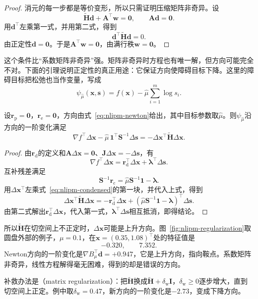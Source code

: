\begin{proof}
消元的每一步都是等价变形，所以只需证明压缩矩阵非奇异。设
\[
 \tilde{\bm{H}}\bm{d}+\bm{A}^\top\bm{w}=\bm{0},\qquad\bm{A}\bm{d}=\bm{0}.
\]
用$\bm{d}^\top$左乘第一式，并用第二式，得到
\[
 \bm{d}^\top\tilde{\bm{H}}\bm{d}=0.
\]
由正定性$\bm{d}=\bm{0}$。于是$\bm{A}^\top\bm{w}=\bm{0}$，由满行秩$\bm{w}=\bm{0}$。
\end{proof}

这个条件比“系数矩阵非奇异”强。矩阵非奇异时方程也有唯一解，但方向可能完全不对。下面的引理说明正定性的真正用途：它保证方向使障碍目标下降。这里的障碍目标把松弛也当作变量，写成
\[
 \psi_{\hat{\mu}}(\bm{x},\bm{s})=f(\bm{x})-\hat{\mu}\sum_{i=1}^m\log s_i.
\]

\begin{lemma}[方向与障碍目标]
\label{lem:nlipm-descent}
设$\bm{r}_{\mathrm{p}}=\bm{0}$，$\bm{r}_{\mathrm{e}}=\bm{0}$，方向由式~\eqref{eq:nlipm-newton}给出，其中目标参数取$\hat{\mu}$。则$\psi_{\hat{\mu}}$沿方向的一阶变化满足
\begin{equation}
 \nabla f^\top\Delta\bm{x}-\hat{\mu}\,\bm{1}^\top\bm{S}^{-1}\Delta\bm{s}=-\Delta\bm{x}^\top\tilde{\bm{H}}\Delta\bm{x}.
 \label{eq:nlipm-descent}
\end{equation}
\end{lemma}

\begin{proof}
由$\bm{r}_{\mathrm{d}}$的定义和$\bm{A}\Delta\bm{x}=\bm{0}$、$\bm{J}\Delta\bm{x}=-\Delta\bm{s}$，有
\[
 \nabla f^\top\Delta\bm{x}=\bm{r}_{\mathrm{d}}^\top\Delta\bm{x}+\bm{\lambda}^\top\Delta\bm{s}.
\]
互补残差满足
\[
 \bm{S}^{-1}\bm{r}_{\mathrm{c}}=\hat{\mu}\bm{S}^{-1}\bm{1}-\bm{\lambda}.
\]
用$\Delta\bm{x}^\top$左乘式~\eqref{eq:nlipm-condensed}的第一块，并代入上式，得到
\[
 \Delta\bm{x}^\top\tilde{\bm{H}}\Delta\bm{x}=-\bm{r}_{\mathrm{d}}^\top\Delta\bm{x}+(\hat{\mu}\bm{S}^{-1}\bm{1}-\bm{\lambda})^\top\Delta\bm{s}.
\]
由第二式解出$\bm{r}_{\mathrm{d}}^\top\Delta\bm{x}$，代入第一式，$\bm{\lambda}^\top\Delta\bm{s}$相互抵消，即得结论。
\end{proof}

所以$\tilde{\bm{H}}$在切空间上不正定时，$\Delta\bm{x}$可能是上升方向。图~\ref{fig:nlipm-regularization}取圆盘外部的例子，$\mu=0.1$，在$\bm{x}=(0.35,1.08)^\top$处的特征值是
\[
 -0.320,\qquad 7.352.
\]
Newton方向的一阶变化是$\nabla B_\mu^\top\bm{d}=+0.947$，它是上升方向，指向鞍点。系数矩阵非奇异，线性方程解得毫无困难，得到的却是错误的方向。

补救办法是（matrix regularization）：把$\tilde{\bm{H}}$换成$\tilde{\bm{H}}+\delta_{\mathrm{w}}\bm{I}$，$\delta_{\mathrm{w}}\geq0$逐步增大，直到切空间上正定。例中取$\delta_{\mathrm{w}}=0.47$，新方向的一阶变化是$-2.73$，变成下降方向。

